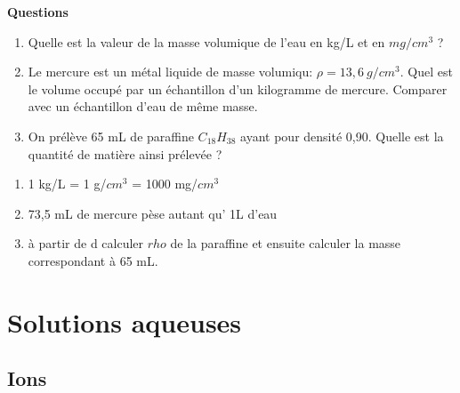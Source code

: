 \documentclass[
]{book}
\providecommand{\tightlist}{%
  \setlength{\itemsep}{0pt}\setlength{\parskip}{0pt}}
\def\tightlist{}
\begin{document}
\begin{blackbox}

\begin{center}
\textbf{Questions}

\end{center}

\begin{enumerate}
\def\labelenumi{\arabic{enumi}.}
\tightlist
\item
  Quelle est la valeur de la masse volumique de l'eau en kg/L et en \(mg/cm^3\) ?
\item
  Le mercure est un métal liquide de masse volumiqu: \(\rho= 13,6\:g/cm^3\). Quel est le volume occupé par un échantillon d'un kilogramme de mercure. Comparer avec un échantillon d'eau de même masse.
\item
  On prélève 65 mL de paraffine \(C_{18}H_{38}\) ayant pour densité 0,90. Quelle est la quantité de matière ainsi prélevée ?
\end{enumerate}

\end{blackbox}

\begin{enumerate}
\def\labelenumi{\arabic{enumi}.}
\tightlist
\item
  1 kg/L = 1 g/\(cm^3\) = 1000 mg/\(cm^3\)
\item
  73,5 mL de mercure pèse autant qu' 1L d'eau
\item
  à partir de d calculer \(rho\) de la paraffine et ensuite calculer la masse correspondant à 65 mL.
\end{enumerate}

\hypertarget{solutions-aqueuses}{%
\section{Solutions aqueuses}\label{solutions-aqueuses}}

\hypertarget{ions}{%
\subsection{Ions}\label{ions}}
\end{document}
